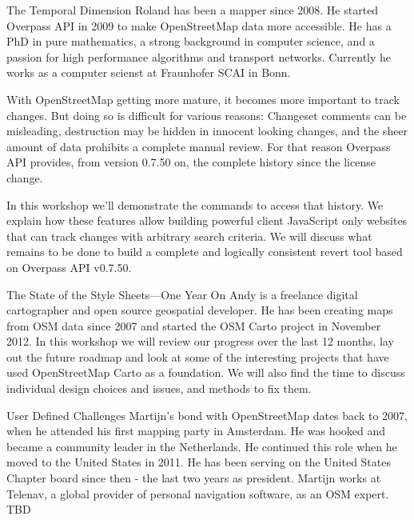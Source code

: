 %
{The Temporal Dimension}%
{Roland has been a mapper since 2008. He started Overpass API in 2009 to make OpenStreetMap data more accessible. He has a PhD in pure mathematics, a strong background in computer science, and a passion for high performance algorithms and transport networks. Current\-ly he works as a computer scienst at Fraunhofer SCAI in Bonn. }%
{With OpenStreetMap getting more mature, it becomes more important to track changes. But doing so is difficult for various reasons: Changeset comments can be misleading, destruction may be hidden in innocent looking changes, and the sheer amount of data prohibits a complete manual review. For that reason Overpass API provides, from version 0.7.50 on, the complete history since the license change. 

In this workshop we'll demonstrate the commands to access that history. We explain how these features allow building powerful client JavaScript only websites that can track changes with arbitrary search criteria. We will discuss what remains to be done to build a complete and logically consistent revert tool based on Overpass API v0.7.50. }


%
{The State of the Style Sheets---One Year On}%
{Andy is a freelance digital cartographer and open sour\-ce geospatial developer. He has been creating maps from OSM data since 2007 and started the OSM Carto project in November 2012. }%
{ In this workshop we will review our progress over the last 12 months, lay out the future roadmap and look at some of the interesting projects that have used OpenStreetMap Carto as a foundation. We will also find the time to discuss individual design choices and issues, and methods to fix them.
}

%
{User Defined Challenges}%
{Martijn's bond with OpenStreetMap dates back to 2007, when he attended his first mapping party in Amsterdam. He was hooked and became a community leader in the Netherlands. He continued this role when he moved to the United States in 2011. He has been serving on the United States Chapter board since then - the last two years as president. Martijn works at Telenav, a global provider of personal navigation software, as an OSM expert. }%
{TBD
}%
